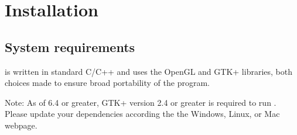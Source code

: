 \section{Installation}

\subsection{System requirements}

\map{} is written in standard C/C++ and uses the OpenGL and GTK+ libraries, 
both choices made to ensure broad portability of the program.

Note: As of \map{} 6.4 or greater, GTK+ version 2.4 or greater is required
to run \map{}.  Please update your dependencies according the the 
Windows, Linux, or Mac webpage.


